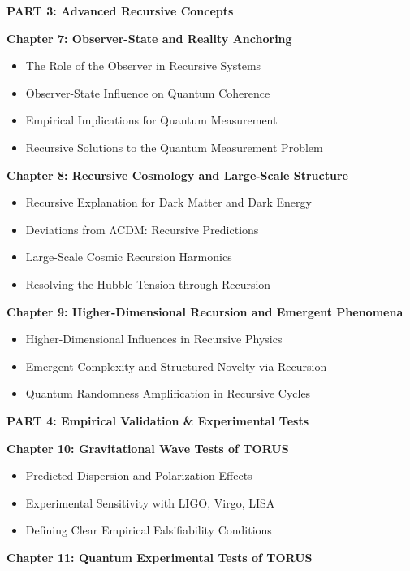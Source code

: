 \documentclass[
]{article}
\begin{document}
\textbf{PART 3: Advanced Recursive Concepts}

\textbf{Chapter 7: Observer-State and Reality Anchoring}

\begin{itemize}
\item
  The Role of the Observer in Recursive Systems
\item
  Observer-State Influence on Quantum Coherence
\item
  Empirical Implications for Quantum Measurement
\item
  Recursive Solutions to the Quantum Measurement Problem
\end{itemize}

\textbf{Chapter 8: Recursive Cosmology and Large-Scale Structure}

\begin{itemize}
\item
  Recursive Explanation for Dark Matter and Dark Energy
\item
  Deviations from ΛCDM: Recursive Predictions
\item
  Large-Scale Cosmic Recursion Harmonics
\item
  Resolving the Hubble Tension through Recursion
\end{itemize}

\textbf{Chapter 9: Higher-Dimensional Recursion and Emergent Phenomena}

\begin{itemize}
\item
  Higher-Dimensional Influences in Recursive Physics
\item
  Emergent Complexity and Structured Novelty via Recursion
\item
  Quantum Randomness Amplification in Recursive Cycles
\end{itemize}

\textbf{PART 4: Empirical Validation \& Experimental Tests}

\textbf{Chapter 10: Gravitational Wave Tests of TORUS}

\begin{itemize}
\item
  Predicted Dispersion and Polarization Effects
\item
  Experimental Sensitivity with LIGO, Virgo, LISA
\item
  Defining Clear Empirical Falsifiability Conditions
\end{itemize}

\textbf{Chapter 11: Quantum Experimental Tests of TORUS}
\end{document}
